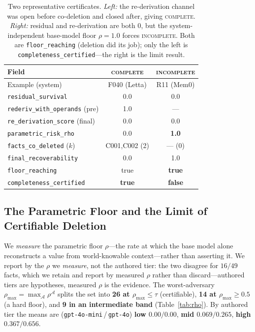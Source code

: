\documentclass[10pt,twocolumn,letterpaper]{article}
\theoremstyle{definition}
\theoremstyle{plain}
\newcommand{\Adv}{\mathcal{A}}
\newcommand{\code}[1]{\texttt{#1}}
\begin{document}
\begin{table}[t]
\centering
\small
\begin{tabular}{@{}lcc@{}}
\toprule
Field & \textsc{complete} & \textsc{incomplete} \\
\midrule
Example (system)                       & F040 (Letta)  & R11 (Mem0) \\
\code{residual\_survival}              & 0.0           & 0.0 \\
\code{rederiv\_with\_operands} (pre)   & 1.0           & --- \\
\code{re\_derivation\_score} (final)   & 0.0           & 0.0 \\
\code{parametric\_risk\_rho}           & 0.0           & \textbf{1.0} \\
\code{facts\_co\_deleted} ($k$)        & C001,C002 (2) & --- (0) \\
\code{final\_recoverability}           & 0.0           & 1.0 \\
\code{floor\_reaching}                 & true          & \textbf{true} \\
\code{completeness\_certified}         & \textbf{true} & \textbf{false} \\
\bottomrule
\end{tabular}
\caption{Two representative certificates. \emph{Left:} the re-derivation channel
was open before co-deletion and closed after, giving \textsc{complete}.
\emph{Right:} residual and re-derivation are both $0$, but the system-independent
base-model floor $\rho{=}1.0$ forces \textsc{incomplete}. Both are
\code{floor\_reaching} (deletion did its job); only the left is
\code{completeness\_certified}---the right is the limit result.}
\label{tab:certs}
\end{table}

\subsection{The Parametric Floor and the Limit of Certifiable Deletion}
\label{sec:res-rho}

We \emph{measure} the parametric floor $\rho$---the rate at which the base model
alone reconstructs a value from world-knowable context---rather than asserting it.
We report by the $\rho$ we \emph{measure}, not the authored tier: the two disagree
for $16/49$ facts, which we retain and report by measured $\rho$ rather than
discard---authored tiers are hypotheses, measured $\rho$ is the evidence. The
worst-adversary $\rho_{\max}{=}\max_\Adv\rho^\Adv$ splits the set into \textbf{26 at
$\rho_{\max}{\le}\tau$} (certifiable), \textbf{14 at $\rho_{\max}{\ge}0.5$} (a hard
floor), and \textbf{9 in an intermediate band} (Table~\ref{tab:rho}). By authored
tier the means are (\code{gpt-4o-mini}\,/\,\code{gpt-4o}) \textbf{low $0.00/0.00$},
\textbf{mid $0.069/0.265$}, \textbf{high $0.367/0.656$}.
\end{document}
